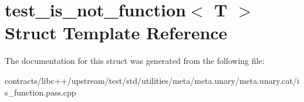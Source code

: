 \hypertarget{structtest__is__not__function}{}\section{test\+\_\+is\+\_\+not\+\_\+function$<$ T $>$ Struct Template Reference}
\label{structtest__is__not__function}


The documentation for this struct was generated from the following file\+:\begin{DoxyCompactItemize}
\item 
contracts/libc++/upstream/test/std/utilities/meta/meta.\+unary/meta.\+unary.\+cat/is\+\_\+function.\+pass.\+cpp\end{DoxyCompactItemize}

